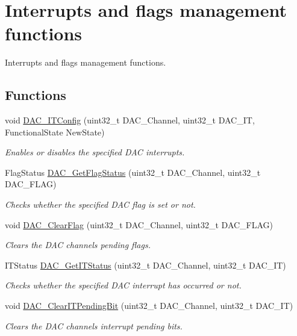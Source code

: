 \hypertarget{group___d_a_c___group3}{}\section{Interrupts and flags management functions}
\label{group___d_a_c___group3}


Interrupts and flags management functions.  


\subsection*{Functions}
\begin{DoxyCompactItemize}
\item 
void \hyperlink{group___d_a_c___group3_ga12d7495b30eae40c2570118cabbda1c3}{D\+A\+C\+\_\+\+I\+T\+Config} (uint32\+\_\+t D\+A\+C\+\_\+\+Channel, uint32\+\_\+t D\+A\+C\+\_\+\+IT, Functional\+State New\+State)
\begin{DoxyCompactList}\small\item\em Enables or disables the specified D\+AC interrupts. \end{DoxyCompactList}\item 
Flag\+Status \hyperlink{group___d_a_c___group3_ga9ee60b78f0ccd23bfbe54bce2a2f909b}{D\+A\+C\+\_\+\+Get\+Flag\+Status} (uint32\+\_\+t D\+A\+C\+\_\+\+Channel, uint32\+\_\+t D\+A\+C\+\_\+\+F\+L\+AG)
\begin{DoxyCompactList}\small\item\em Checks whether the specified D\+AC flag is set or not. \end{DoxyCompactList}\item 
void \hyperlink{group___d_a_c___group3_ga49543c52786d70d6b6311f3fee856d37}{D\+A\+C\+\_\+\+Clear\+Flag} (uint32\+\_\+t D\+A\+C\+\_\+\+Channel, uint32\+\_\+t D\+A\+C\+\_\+\+F\+L\+AG)
\begin{DoxyCompactList}\small\item\em Clears the D\+AC channel\textquotesingle{}s pending flags. \end{DoxyCompactList}\item 
I\+T\+Status \hyperlink{group___d_a_c___group3_ga541aac3b50db3a8a806ec5ef30679aca}{D\+A\+C\+\_\+\+Get\+I\+T\+Status} (uint32\+\_\+t D\+A\+C\+\_\+\+Channel, uint32\+\_\+t D\+A\+C\+\_\+\+IT)
\begin{DoxyCompactList}\small\item\em Checks whether the specified D\+AC interrupt has occurred or not. \end{DoxyCompactList}\item 
void \hyperlink{group___d_a_c___group3_ga12d90e69a2642997136b23224d180641}{D\+A\+C\+\_\+\+Clear\+I\+T\+Pending\+Bit} (uint32\+\_\+t D\+A\+C\+\_\+\+Channel, uint32\+\_\+t D\+A\+C\+\_\+\+IT)
\begin{DoxyCompactList}\small\item\em Clears the D\+AC channel\textquotesingle{}s interrupt pending bits. \end{DoxyCompactList}\end{DoxyCompactItemize}


